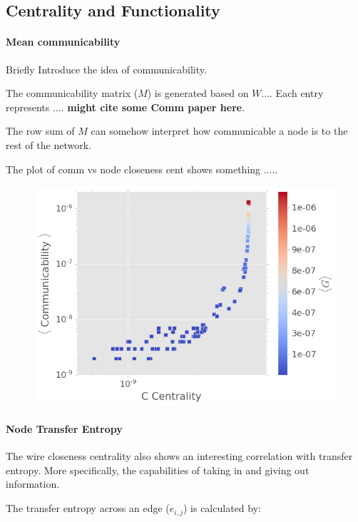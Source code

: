 \documentclass[%
 reprint,
 amsmath,amssymb,
 aps,
]{revtex4-2}
\begin{document}
\subsection{\label{sec:level2} Centrality and Functionality}

\paragraph{Mean communicability}
Briefly Introduce the idea of communicability. 

The communicability matrix ($M$) is generated based on $W$.... Each entry represents .... \textbf{might cite some Comm paper here}.

The row sum of $M$ can somehow interpret how communicable a node is to the rest of the network.

The plot of comm vs node closeness cent shows something .....

\begin{figure}[h]
	\centering
	\includegraphics[width=1\linewidth]{figure/comm_cent}
	\caption{}
	\label{fig:comm_cent}
\end{figure}

\paragraph{Node Transfer Entropy}
The wire closeness centrality also shows an interesting correlation with transfer entropy. More specifically, the capabilities of taking in and giving out information. 

The transfer entropy across an edge ($e_{i,j}$) is calculated by:
\end{document}
